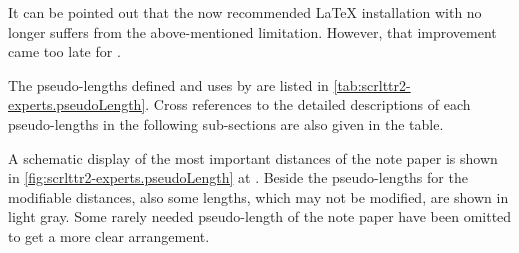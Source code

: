 It can be pointed out that the now recommended {\LaTeX} installation with
{\eTeX} no longer suffers from the above-mentioned limitation. However, that
improvement came too late for .

The pseudo-lengths defined and uses by  are listed in
\autoref{tab:scrlttr2-experts.pseudoLength}. Cross references to the detailed
descriptions of each pseudo-lengths in the following sub-sections are also
given in the table.

A schematic display of the most important distances of the note paper is shown
in \autoref{fig:scrlttr2-experts.pseudoLength} at
. Beside the
pseudo-lengths for the modifiable distances, also some lengths, which may not
be modified, are shown in light gray. Some rarely needed pseudo-length of the
note paper have been omitted to get a more clear arrangement.
%
